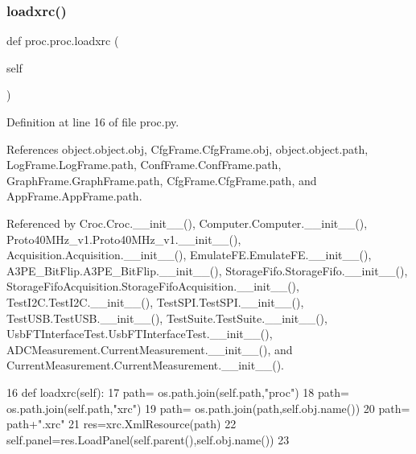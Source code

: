 \subsubsection{\texorpdfstring{loadxrc()}{loadxrc()}}
{\footnotesize\ttfamily def proc.\+proc.\+loadxrc (\begin{DoxyParamCaption}\item[{}]{self }\end{DoxyParamCaption})\hspace{0.3cm}{\ttfamily [inherited]}}



Definition at line 16 of file proc.\+py.



References object.\+object.\+obj, Cfg\+Frame.\+Cfg\+Frame.\+obj, object.\+object.\+path, Log\+Frame.\+Log\+Frame.\+path, Conf\+Frame.\+Conf\+Frame.\+path, Graph\+Frame.\+Graph\+Frame.\+path, Cfg\+Frame.\+Cfg\+Frame.\+path, and App\+Frame.\+App\+Frame.\+path.



Referenced by Croc.\+Croc.\+\_\+\+\_\+init\+\_\+\+\_\+(), Computer.\+Computer.\+\_\+\+\_\+init\+\_\+\+\_\+(), Proto40\+M\+Hz\+\_\+v1.\+Proto40\+M\+Hz\+\_\+v1.\+\_\+\+\_\+init\+\_\+\+\_\+(), Acquisition.\+Acquisition.\+\_\+\+\_\+init\+\_\+\+\_\+(), Emulate\+F\+E.\+Emulate\+F\+E.\+\_\+\+\_\+init\+\_\+\+\_\+(), A3\+P\+E\+\_\+\+Bit\+Flip.\+A3\+P\+E\+\_\+\+Bit\+Flip.\+\_\+\+\_\+init\+\_\+\+\_\+(), Storage\+Fifo.\+Storage\+Fifo.\+\_\+\+\_\+init\+\_\+\+\_\+(), Storage\+Fifo\+Acquisition.\+Storage\+Fifo\+Acquisition.\+\_\+\+\_\+init\+\_\+\+\_\+(), Test\+I2\+C.\+Test\+I2\+C.\+\_\+\+\_\+init\+\_\+\+\_\+(), Test\+S\+P\+I.\+Test\+S\+P\+I.\+\_\+\+\_\+init\+\_\+\+\_\+(), Test\+U\+S\+B.\+Test\+U\+S\+B.\+\_\+\+\_\+init\+\_\+\+\_\+(), Test\+Suite.\+Test\+Suite.\+\_\+\+\_\+init\+\_\+\+\_\+(), Usb\+F\+T\+Interface\+Test.\+Usb\+F\+T\+Interface\+Test.\+\_\+\+\_\+init\+\_\+\+\_\+(), A\+D\+C\+Measurement.\+Current\+Measurement.\+\_\+\+\_\+init\+\_\+\+\_\+(), and Current\+Measurement.\+Current\+Measurement.\+\_\+\+\_\+init\+\_\+\+\_\+().


\begin{DoxyCode}
16     \textcolor{keyword}{def }loadxrc(self):
17         path= os.path.join(self.path,\textcolor{stringliteral}{"proc"})
18         path= os.path.join(self.path,\textcolor{stringliteral}{"xrc"})
19         path= os.path.join(path,self.obj.name())
20         path= path+\textcolor{stringliteral}{".xrc"}
21         res=xrc.XmlResource(path)
22         self.panel=res.LoadPanel(self.parent(),self.obj.name())
23         
\end{DoxyCode}
\mbox{\label{classproc_1_1proc_a41bdd5dd3af283e3f0053c1a0c7fa7bf}} 
